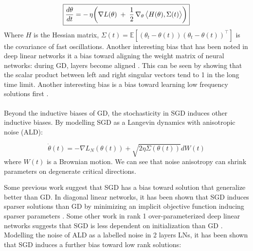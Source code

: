 \documentclass[11pt]{article}
\begin{document}
\[
\boxed{%
  \frac{d \theta}{d t}
  = -\,\eta\!\left(
      \nabla L(\theta)
      \;+\;\frac{1}{2}\,
      \nabla_{\theta}\,\bigl\langle H(\theta),\Sigma(t)\bigr\rangle
    \right)}    
\]
Where $H$ is the Hessian matrix, $\Sigma(t) = \mathbb{E}[(\theta_{t}-\theta(t))(\theta_{t}-\theta(t))^{\!\top}]$ is the covariance of fast oscillations.
Another interesting bias that has been noted in deep linear networks it a bias toward aligning the weight matrix of neural networks: during GD, layers become aligned \citep{ji2018gradient}. This can be seen by showing that the scalar product between left and right singular vectors tend to 1 in the long time limit. Another interesting bias is a bias toward learning low frequency solutions first \citep{xu2024overview}.
\\
\\
Beyond the inductive biases of GD, the stochasticity in SGD induces other inductive biases. By modelling SGD as a Langevin dynamics with anisotropic noise (ALD):

\begin{equation}
    \dot{\theta}(t) = -\nabla L_N(\theta(t)) + \sqrt{2\eta\Sigma(\theta(t))} dW(t)
\end{equation}
where $W(t)$ is a Brownian motion. We can see that noise anisotropy can shrink parameters on degenerate critical directions.

Some previous work suggest that SGD has a bias toward solution that generalize better than GD. In diagonal linear networks, it has been shown that SGD induces sparser solutions than GD by minimizing an implicit objective function inducing sparser parameters \citep{pesme2021implicit}. Some other work in rank 1 over-parameterized deep linear networks suggests that SGD is less dependent on initialization than GD \citep{lyu2023implicit}. Modelling the noise of ALD as a labelled noise in 2 layers LNs, it has been shown that SGD induces a further bias toward low rank solutions\citep{varre2024sgd}:

\end{document}
